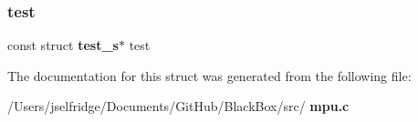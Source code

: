 \mbox{\label{structgyro__state__s_a4dc7fb069be996a5f40e25c01338a3ca}} 
\subsubsection{test}
{\footnotesize\ttfamily const struct \textbf{ test\+\_\+s}$\ast$ test}



The documentation for this struct was generated from the following file\+:\begin{DoxyCompactItemize}
\item 
/\+Users/jselfridge/\+Documents/\+Git\+Hub/\+Black\+Box/src/\textbf{ mpu.\+c}\end{DoxyCompactItemize}
